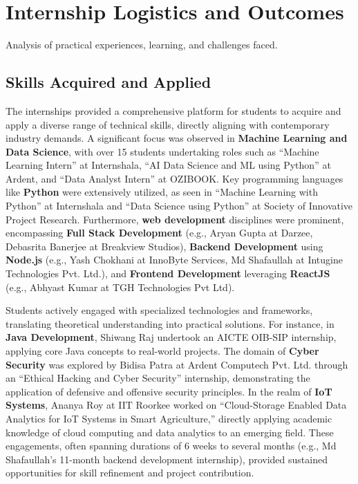 \documentclass[11pt,a4paper]{article}
\newenvironment{card}{
    \begin{tcolorbox}[
        enhanced,
        colback=cardback,
        colframe=border,
        sharp corners,
        boxrule=0.5pt,
        drop shadow,
        shadow xshift=1mm,
        shadow yshift=-1mm,
        shadow color=border!50,
        boxsep=3mm,
        left=5mm, right=5mm, top=5mm, bottom=5mm,
        width=\textwidth,
        nobeforeafter
    ]
}{\end{tcolorbox}}
\begin{document}
\clearpage

\section*{\textcolor{accent}{Internship Logistics and Outcomes}}
{\large\textcolor{muted}{Analysis of practical experiences, learning, and challenges faced.}}

\vspace{0.5cm}

\begin{card}
    \subsection*{\textcolor{accent}{Skills Acquired and Applied}}
    \vspace{0.3cm}
    The internships provided a comprehensive platform for students to acquire and apply a diverse range of technical skills, directly aligning with contemporary industry demands. A significant focus was observed in \textbf{Machine Learning and Data Science}, with over 15 students undertaking roles such as ``Machine Learning Intern'' at Internshala, ``AI Data Science and ML using Python'' at Ardent, and ``Data Analyst Intern'' at OZIBOOK. Key programming languages like \textbf{Python} were extensively utilized, as seen in ``Machine Learning with Python'' at Internshala and ``Data Science using Python'' at Society of Innovative Project Research. Furthermore, \textbf{web development} disciplines were prominent, encompassing \textbf{Full Stack Development} (e.g., Aryan Gupta at Darzee, Debasrita Banerjee at Breakview Studios), \textbf{Backend Development} using \textbf{Node.js} (e.g., Yash Chokhani at InnoByte Services, Md Shafaullah at Intugine Technologies Pvt. Ltd.), and \textbf{Frontend Development} leveraging \textbf{ReactJS} (e.g., Abhyast Kumar at TGH Technologies Pvt Ltd).

    Students actively engaged with specialized technologies and frameworks, translating theoretical understanding into practical solutions. For instance, in \textbf{Java Development}, Shiwang Raj undertook an AICTE OIB-SIP internship, applying core Java concepts to real-world projects. The domain of \textbf{Cyber Security} was explored by Bidisa Patra at Ardent Computech Pvt. Ltd. through an ``Ethical Hacking and Cyber Security'' internship, demonstrating the application of defensive and offensive security principles. In the realm of \textbf{IoT Systems}, Ananya Roy at IIT Roorkee worked on ``Cloud-Storage Enabled Data Analytics for IoT Systems in Smart Agriculture,'' directly applying academic knowledge of cloud computing and data analytics to an emerging field. These engagements, often spanning durations of 6 weeks to several months (e.g., Md Shafaullah's 11-month backend development internship), provided sustained opportunities for skill refinement and project contribution.


\end{card}
\end{document}
